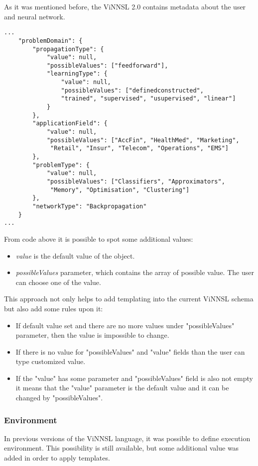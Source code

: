 As it was mentioned before, the ViNNSL 2.0 contains metadata about the user and neural network.

\begin{lstlisting}
...
	"problemDomain": {
		"propagationType": {
			"value": null,
			"possibleValues": ["feedforward"],
			"learningType": {
				"value": null,
				"possibleValues": ["definedconstructed", 
				"trained", "supervised", "usupervised", "linear"]
			}
		},
		"applicationField": {
			"value": null,
			"possibleValues": ["AccFin", "HealthMed", "Marketing",
			 "Retail", "Insur", "Telecom", "Operations", "EMS"]
		},
		"problemType": {
			"value": null,
			"possibleValues": ["Classifiers", "Approximators",
			 "Memory", "Optimisation", "Clustering"]
		},
		"networkType": "Backpropagation"
	}
...
\end{lstlisting}

From code above it is possible to spot some additional values:
\begin{itemize}
\item \emph{value} is the default value of the object. 
\item \emph{possibleValues} parameter, which contains the array of possible value. The user can choose one of the value. 
\end{itemize}

This approach not only helps to add templating into the current ViNNSL schema but also add some rules upon it:
\begin{itemize}
\item If default value set and there are no more values under "possibleValues" parameter, then the value is impossible to change.
\item If there is no value for "possibleValues" and "value" fields than the user can type customized value.
\item If the "value" has some parameter and "possibleValues" field is also not empty it means that the "value" parameter is the default value and it can be changed by "possibleValues".
\end{itemize}

\subsubsection{Environment}\label{Environment}

In previous versions of the ViNNSL language, it was possible to define execution environment. This possibility is still available, but some additional value was added in order to apply templates. 

